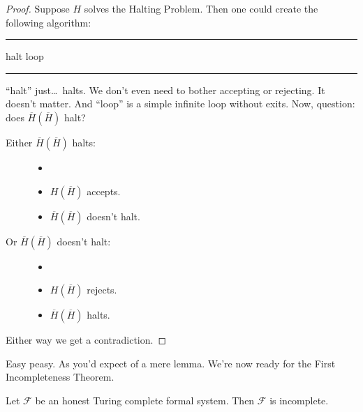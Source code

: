 \documentclass{article}
\theoremstyle{customstyle}
\newcommand{\F}{\ensuremath{\mathcal{F}}}
\newenvironment{algo}{\begin{samepage}\medskip\hrule\begin{algorithmic}}{\end{algorithmic}\hrule\medskip\end{samepage}}
\begin{document}
\begin{proof}\vspace{-\topsep}
Suppose $H$ solves the Halting Problem. Then one could create the following algorithm:
\begin{algo}
    \State halt
  \EndIf
    \State loop
  \EndIf
\EndFunction
\end{algo}
``halt'' just\dots\ halts. We don't even need to bother accepting or rejecting. It doesn't matter. And ``loop'' is a simple infinite loop without exits. Now, question: does $\overline{H}(\overline{H})$ halt?
\newline
\begin{minipage}{0.5\textwidth}
\smallskip
\begin{description}
\item[Either $\overline{H}(\overline{H})$ halts:]
\begin{itemize}[noitemsep]
\item[]
\item $H(\overline{H})$ accepts.
\item $\overline{H}(\overline{H})$ doesn't halt. \lightning
\end{itemize}
\end{description}
\smallskip
\end{minipage}
\begin{minipage}{0.45\textwidth}
\smallskip
\begin{description}
\item[Or $\overline{H}(\overline{H})$ doesn't halt:]
\begin{itemize}[noitemsep]
\item[]
\item $H(\overline{H})$ rejects.
\item $\overline{H}(\overline{H})$ halts. \lightning
\end{itemize}
\end{description}
\smallskip
\end{minipage}
\newline
Either way we get a contradiction.
\end{proof}

Easy peasy. As you'd expect of a mere lemma. We're now ready for the First Incompleteness Theorem.

\begin{theorem}
\label{original-first-by-computation}
Let $\F$ be an honest Turing complete formal system. Then $\F$ is incomplete.
\end{theorem}
\end{document}
